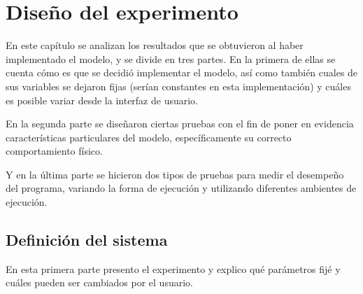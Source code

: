 \chapter{Diseño del experimento}
En este capítulo se analizan los resultados que se obtuvieron al haber implementado el modelo, y se divide en tres partes.
En la primera de ellas se cuenta cómo es que se decidió implementar el modelo, así como también cuales de sus variables se dejaron fijas (serían constantes en esta implementación) y cuáles es posible variar desde la interfaz de usuario.

En la segunda parte se diseñaron ciertas pruebas con el fin de poner en evidencia características particulares del modelo, específicamente su correcto comportamiento físico.

Y en la última parte se hicieron dos tipos de pruebas para medir el desempeño del programa, variando la forma de ejecución y utilizando diferentes ambientes de ejecución.

\section{Definición del sistema}
En esta primera parte presento el experimento y explico qué parámetros fijé y cuáles pueden ser cambiados por el usuario.


